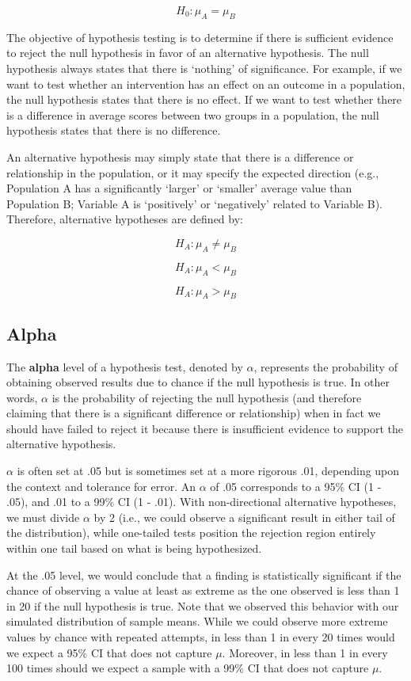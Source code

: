 \documentclass[
]{book}
\begin{document}
\[ H_0: \mu_A = \mu_B \]

The objective of hypothesis testing is to determine if there is sufficient evidence to reject the null hypothesis in favor of an alternative hypothesis. The null hypothesis always states that there is `nothing' of significance. For example, if we want to test whether an intervention has an effect on an outcome in a population, the null hypothesis states that there is no effect. If we want to test whether there is a difference in average scores between two groups in a population, the null hypothesis states that there is no difference.

An alternative hypothesis may simply state that there is a difference or relationship in the population, or it may specify the expected direction (e.g., Population A has a significantly `larger' or `smaller' average value than Population B; Variable A is `positively' or `negatively' related to Variable B). Therefore, alternative hypotheses are defined by:

\[ H_A: \mu_A \neq \mu_B \]

\[ H_A: \mu_A < \mu_B \]

\[ H_A: \mu_A > \mu_B \]

\hypertarget{alpha}{%
\subsection{Alpha}\label{alpha}}

The \textbf{alpha} level of a hypothesis test, denoted by \(\alpha\), represents the probability of obtaining observed results due to chance if the null hypothesis is true. In other words, \(\alpha\) is the probability of rejecting the null hypothesis (and therefore claiming that there is a significant difference or relationship) when in fact we should have failed to reject it because there is insufficient evidence to support the alternative hypothesis.

\(\alpha\) is often set at .05 but is sometimes set at a more rigorous .01, depending upon the context and tolerance for error. An \(\alpha\) of .05 corresponds to a 95\% CI (1 - .05), and .01 to a 99\% CI (1 - .01). With non-directional alternative hypotheses, we must divide \(\alpha\) by 2 (i.e., we could observe a significant result in either tail of the distribution), while one-tailed tests position the rejection region entirely within one tail based on what is being hypothesized.

At the .05 level, we would conclude that a finding is statistically significant if the chance of observing a value at least as extreme as the one observed is less than 1 in 20 if the null hypothesis is true. Note that we observed this behavior with our simulated distribution of sample means. While we could observe more extreme values by chance with repeated attempts, in less than 1 in every 20 times would we expect a 95\% CI that does not capture \(\mu\). Moreover, in less than 1 in every 100 times should we expect a sample with a 99\% CI that does not capture \(\mu\).
\end{document}
